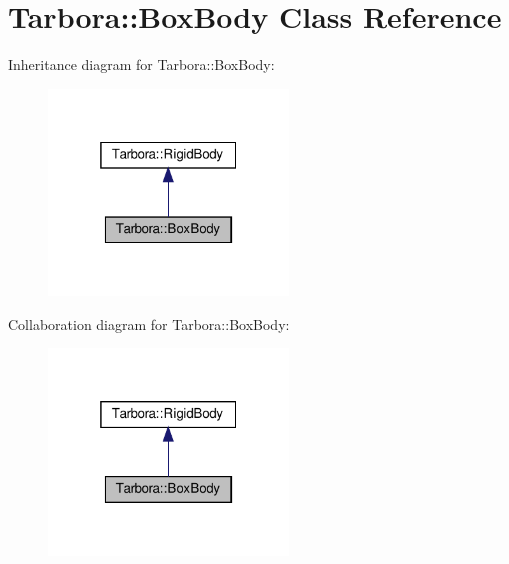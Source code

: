 \hypertarget{classTarbora_1_1BoxBody}{}\section{Tarbora\+:\+:Box\+Body Class Reference}
\label{classTarbora_1_1BoxBody}


Inheritance diagram for Tarbora\+:\+:Box\+Body\+:\nopagebreak
\begin{figure}[H]
\begin{center}
\leavevmode
\includegraphics[width=181pt]{classTarbora_1_1BoxBody__inherit__graph}
\end{center}
\end{figure}


Collaboration diagram for Tarbora\+:\+:Box\+Body\+:\nopagebreak
\begin{figure}[H]
\begin{center}
\leavevmode
\includegraphics[width=181pt]{classTarbora_1_1BoxBody__coll__graph}
\end{center}
\end{figure}
